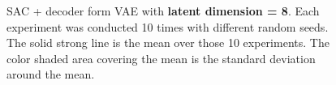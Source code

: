 \begin{figure}
    \begin{center}
        \hfill
    \end{center}
    \caption[SAC + VAE on latent dim = 8]{SAC + decoder form VAE with \textbf{latent dimension = 8}. Each experiment was conducted 10 times with different random seeds. The solid strong line is the mean over those 10 experiments. The color shaded area covering the mean is the standard deviation around the mean.}
    \label{fig:SAC_latent_8}
\end{figure}



